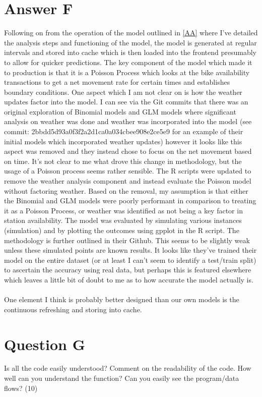 \documentclass{scrreprt}
\begin{document}
\section{Answer F}\label{AF}
Following on from the operation of the model outlined in \ref{AA} where I've detailed the analysis steps and functioning of the model, the model is generated at regular intervals and stored into cache which is then loaded into the frontend presumably to allow for quicker predictions. The key component of the model which made it to production is that it is a Poisson Process which looks at the bike availability transactions to get a net movement rate for certain times and establishes boundary conditions. One aspect which I am not clear on is how the weather updates factor into the model. I can see via the Git commits that there was an original exploration of Binomial models and GLM models where significant analysis on weather was done and weather was incorporated into the model (see commit:  2bbdd5d93a0f3f2a2d1ca0a034cbee908e2ce5e9 for an example of their initial models which incorporated weather updates) however it looks like this aspect was removed and they instead chose to focus on the net movement based on time. It's not clear to me what drove this change in methodology, but the usage of a Poisson process seems rather sensible. The R scripts were updated to remove the weather analysis component and instead evaluate the Poisson model without factoring weather. Based on the removal, my assumption is that either the Binomial and GLM models were poorly performant in comparison to treating it as a Poisson Process, or weather was identified as not being a key factor in station availability. The model was evaluated by simulating various instances (simulation) and by plotting the outcomes using gpplot in the R script. The methodology is further outlined in their Github. This seems to be slightly weak unless these simulated points are known results. It looks like they've trained their model on the entire dataset (or at least I can't seem to identify a test/train split) to ascertain the accuracy using real data, but perhaps this is featured elsewhere which leaves a little bit of doubt to me as to how accurate the model actually is.\\
\\
One element I think is probably better designed than our own models is the continuous refreshing and storing into cache.

\pagebreak
\section{Question G}\label{QG}
Is all the code easily understood? Comment on the readability of the code. How well can you understand the function? Can you easily see the program/data flows? (10)
\end{document}
